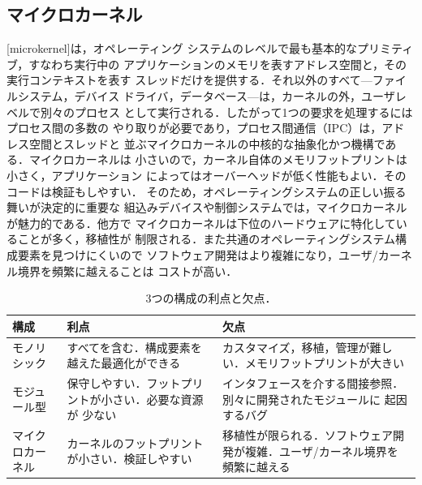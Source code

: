 \documentclass[../main.tex]{subfiles}
\begin{document}
\subsection{マイクロカーネル}

[microkernel]は，オペレーティング
システムのレベルで最も基本的なプリミティブ，すなわち実行中の
アプリケーションのメモリを表すアドレス空間と，その実行コンテキストを表す
スレッドだけを提供する．それ以外のすべて---ファイルシステム，デバイス
ドライバ，データベース---は，カーネルの外，ユーザレベルで別々のプロセス
として実行される．したがって1つの要求を処理するにはプロセス間の多数の
やり取りが必要であり，プロセス間通信（IPC）は，アドレス空間とスレッドと
並ぶマイクロカーネルの中核的な抽象化かつ機構である．マイクロカーネルは
小さいので，カーネル自体のメモリフットプリントは小さく，アプリケーション
によってはオーバーヘッドが低く性能もよい．そのコードは検証もしやすい．
そのため，オペレーティングシステムの正しい振る舞いが決定的に重要な
組込みデバイスや制御システムでは，マイクロカーネルが魅力的である．他方で
マイクロカーネルは下位のハードウェアに特化していることが多く，移植性が
制限される．また共通のオペレーティングシステム構成要素を見つけにくいので
ソフトウェア開発はより複雑になり，ユーザ/カーネル境界を頻繁に越えることは
コストが高い．

\begin{table}[htbp]
  \centering
  \caption{3つの構成の利点と欠点．}
  \label{tab:l01-organization}
  \small
  \begin{tabular}{@{}>{\RaggedRight}p{19mm}>{\RaggedRight}p{46mm}%
      >{\RaggedRight\arraybackslash}p{47mm}@{}}
    \toprule
    構成 & 利点 & 欠点 \\
    \midrule
    モノリシック & すべてを含む．構成要素を越えた最適化ができる
      & カスタマイズ，移植，管理が難しい．メモリフットプリントが大きい \\
    \addlinespace
    モジュール型 & 保守しやすい．フットプリントが小さい．必要な資源が
      少ない
      & インタフェースを介する間接参照．別々に開発されたモジュールに
      起因するバグ \\
    \addlinespace
    マイクロカーネル & カーネルのフットプリントが小さい．検証しやすい
      & 移植性が限られる．ソフトウェア開発が複雑．ユーザ/カーネル境界を
      頻繁に越える \\
    \bottomrule
  \end{tabular}
\end{table}
\end{document}
